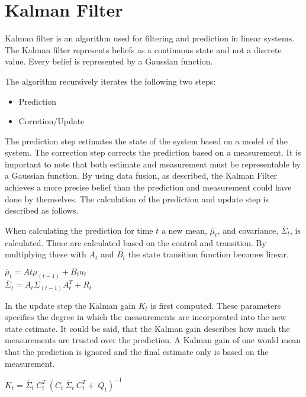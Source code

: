 \chapter{Kalman Filter}
\label{chp:kalman}

Kalman filter is an algorithm used for filtering and prediction in linear systems. The Kalman filter represents beliefs as a continuous state and not a discrete value. Every belief is represented by a Gaussian function.

The algorithm recursively iterates the following two steps:

\begin{itemize}
	\item Prediction
	\item Corretion/Update
\end{itemize}

The prediction step estimates the state of the system based on a model of the system. The correction step corrects the prediction based on a measurement. It is important to note that both estimate and measurement must be representable by a Gaussian function. By using data fusion, as described, the Kalman Filter achieves a more precise belief than the prediction and measurement could have done by themselves. The calculation of the prediction and update step is described as follows.

When calculating the prediction for time $t$ a new mean, $\overline{\mu}_t$, and covariance, $\overline{\Sigma}_t$, is calculated. These are calculated based on the control and transition. By multiplying these with $A_t$ and $B_t$ the state transition function becomes linear.

\begin{center}
$\overline{\mu}_t = At \mu_(t-1)+B_t u_t$  \\
$\overline{\Sigma}_t = A_t \Sigma_(t-1) A^T_t+R_t $ \\
\end{center}

In the update step the Kalman gain $K_t$ is first computed. These parameters specifies the degree in which the measurements are incorporated into the new state estimate. It could be said, that the Kalman gain describes how much the measurements are trusted over the prediction. A Kalman gain of one would mean that the prediction is ignored and the final estimate only is based on the measurement.

\begin{center}
$K_t = \overline{\Sigma}_t \ C^T_t \ (C_t \ \overline{\Sigma}_t \ C^T_t +\ Q_t )^{-1}$ \\
\end{center}	

